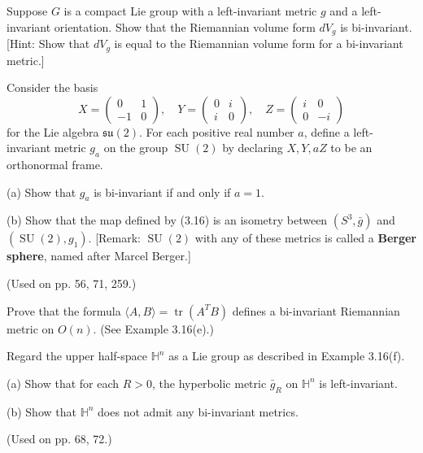 \begin{exercise}
\label{prob:compact-lie-group-volume-form-bi-invariant}
Suppose $G$ is a compact Lie group with a left-invariant metric $g$ and a left-invariant orientation. Show that the Riemannian volume form $dV_g$ is bi-invariant. [Hint: Show that $dV_g$ is equal to the Riemannian volume form for a bi-invariant metric.]
\end{exercise}

\begin{exercise}
\label{prob:berger-sphere}
Consider the basis
\[
X = \begin{pmatrix} 0 & 1 \\ -1 & 0 \end{pmatrix}, \quad Y = \begin{pmatrix} 0 & i \\ i & 0 \end{pmatrix}, \quad Z = \begin{pmatrix} i & 0 \\ 0 & -i \end{pmatrix}
\]
for the Lie algebra $\mathfrak{su}(2)$. For each positive real number $a$, define a left-invariant metric $g_a$ on the group $\operatorname{SU}(2)$ by declaring $X, Y, aZ$ to be an orthonormal frame.

(a) Show that $g_a$ is bi-invariant if and only if $a = 1$.

(b) Show that the map defined by (3.16) is an isometry between $(S^3, \bar{g})$ and $(\operatorname{SU}(2), g_1)$. [Remark: $\operatorname{SU}(2)$ with any of these metrics is called a \textbf{Berger sphere}, named after Marcel Berger.]

(Used on pp. 56, 71, 259.)
\end{exercise}

\begin{exercise}
\label{prob:orthogonal-group-bi-invariant-metric}
Prove that the formula $\langle A, B \rangle = \operatorname{tr}(A^T B)$ defines a bi-invariant Riemannian metric on $O(n)$. (See Example 3.16(e).)
\end{exercise}

\begin{exercise}
\label{prob:hyperbolic-space-metrics}
Regard the upper half-space $\mathbb{H}^n$ as a Lie group as described in Example 3.16(f).

(a) Show that for each $R > 0$, the hyperbolic metric $\bar{g}_R$ on $\mathbb{H}^n$ is left-invariant.

(b) Show that $\mathbb{H}^n$ does not admit any bi-invariant metrics.

(Used on pp. 68, 72.)
\end{exercise}

